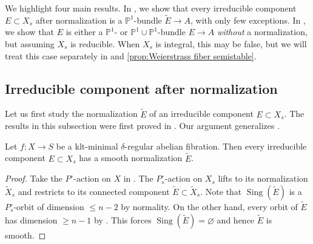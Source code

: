 \documentclass[reqno, letterpaper]{amsart}
\numberwithin{equation}{subsection}
\let\emptyset\varnothing
\let\to\longrightarrow
\newcommand{\PP}{\mathbb{P}}
\DeclareMathOperator{\Sing}{Sing}
\begin{document}
	We highlight four main results. In , we show that every irreducible component $E \subset X_s$ after normalization is a $\PP^1$-bundle $\tilde E \to A$, with only few exceptions. In , we show that $E$ is either a $\PP^1$- or $\PP^1 \cup \PP^1$-bundle $E \to A$ \emph{without} a normalization, but assuming $X_s$ is reducible. When $X_s$ is integral, this may be false, but we will treat this case separately in  and \ref{prop:Weierstrass fiber semistable}.
	
	
	
	\subsection{Irreducible component after normalization}
		Let us first study the normalization $\tilde E$ of an irreducible component $E \subset X_s$. The results in this subsection were first proved in \cite[Theorem~1.3]{hwang-ogu09}. Our argument generalizes \cite[Proposition~5.14]{kim24}.
		
		\begin{proposition} \label{prop:E normalization-preparation}
			Let $f : X \to S$ be a klt-minimal $\delta$-regular abelian fibration. Then every irreducible component $E \subset X_s$ has a smooth normalization $\tilde E$.
		\end{proposition}
		\begin{proof}
			Take the $P^\circ$-action on $X$ in . The $P^\circ_s$-action on $X_s$ lifts to its normalization $\tilde X_s$ and restricts to its connected component $\tilde E \subset \tilde X_s$. Note that $\Sing(\tilde E)$ is a $P^\circ_s$-orbit of dimension $\le n-2$ by normality. On the other hand, every orbit of $\tilde E$ has dimension $\ge n-1$ by . This forces $\Sing(\tilde E) = \emptyset$ and hence $\tilde E$ is smooth.
		\end{proof}
		
\end{document}
